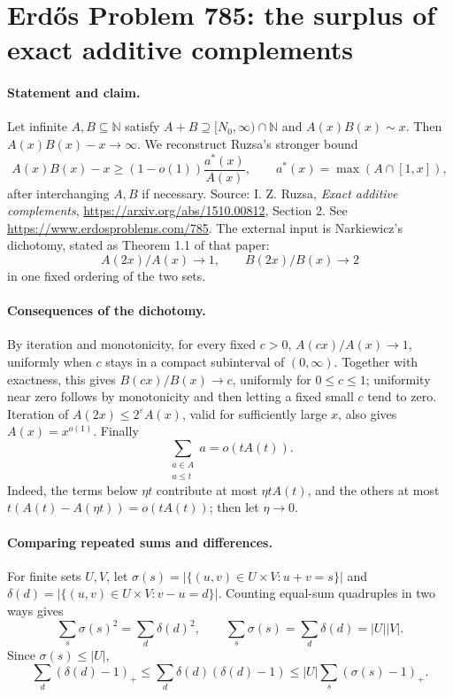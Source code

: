 \section*{Erd\H{o}s Problem 785: the surplus of exact additive complements}

\paragraph{Statement and claim.}
Let infinite \(A,B\subseteq\mathbb N\) satisfy
\(A+B\supseteq[N_0,\infty)\cap\mathbb N\) and
\(A(x)B(x)\sim x\). Then \(A(x)B(x)-x\longrightarrow\infty\).
We reconstruct Ruzsa's stronger bound
\[
 A(x)B(x)-x\geq(1-o(1))\frac{a^*(x)}{A(x)},\qquad
 a^*(x)=\max(A\cap[1,x]),
                                                               \tag{1}
\]
after interchanging \(A,B\) if necessary.
Source: I. Z. Ruzsa, \emph{Exact additive complements},
\url{https://arxiv.org/abs/1510.00812}, Section 2.
See \url{https://www.erdosproblems.com/785}.
The external input is Narkiewicz's dichotomy, stated as
Theorem 1.1 of that paper:
\[
 A(2x)/A(x)\to1,\qquad B(2x)/B(x)\to2
                                                               \tag{2}
\]
in one fixed ordering of the two sets.

\paragraph{Consequences of the dichotomy.}
By iteration and monotonicity, for every fixed \(c>0\),
\(A(cx)/A(x)\to1\), uniformly when \(c\) stays in a compact
subinterval of \((0,\infty)\).
Together with exactness, this gives \(B(cx)/B(x)\to c\),
uniformly for \(0\leq c\leq1\); uniformity near zero follows
by monotonicity and then letting a fixed small \(c\) tend to zero.
Iteration of \(A(2x)\leq2^\varepsilon A(x)\), valid for
sufficiently large \(x\), also gives \(A(x)=x^{o(1)}\).
Finally
\[
 \sum_{\substack{a\in A\\a\leq t}}a=o(tA(t)).                   \tag{3}
\]
Indeed, the terms below \(\eta t\) contribute at most
\(\eta tA(t)\), and the others at most
\(t(A(t)-A(\eta t))=o(tA(t))\); then let \(\eta\to0\).

\paragraph{Comparing repeated sums and differences.}
For finite sets \(U,V\), let
\(\sigma(s)=|\{(u,v)\in U\times V:u+v=s\}|\) and
\(\delta(d)=|\{(u,v)\in U\times V:v-u=d\}|\).
Counting equal-sum quadruples in two ways gives
\[
 \sum_s\sigma(s)^2=\sum_d\delta(d)^2,\qquad
 \sum_s\sigma(s)=\sum_d\delta(d)=|U||V|.
\]
Since \(\sigma(s)\leq |U|\),
\[
 \sum_d(\delta(d)-1)_+
 \leq \sum_d\delta(d)(\delta(d)-1)
 \leq |U|\sum_s(\sigma(s)-1)_+.                                \tag{4}
\]


